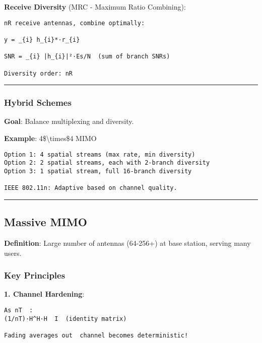 \textbf{Receive Diversity} (MRC - Maximum Ratio Combining):

\begin{verbatim}
nR receive antennas, combine optimally:

y = _{i} h_{i}*·r_{i}

SNR = _{i} |h_{i}|²·Es/N  (sum of branch SNRs)

Diversity order: nR
\end{verbatim}

\begin{center}\rule{0.5\linewidth}{0.5pt}\end{center}

\subsubsection{Hybrid Schemes}\label{hybrid-schemes}

\textbf{Goal}: Balance multiplexing and diversity.

\textbf{Example}: 4\$\textbackslash times\$4 MIMO

\begin{verbatim}
Option 1: 4 spatial streams (max rate, min diversity)
Option 2: 2 spatial streams, each with 2-branch diversity
Option 3: 1 spatial stream, full 16-branch diversity

IEEE 802.11n: Adaptive based on channel quality.
\end{verbatim}

\begin{center}\rule{0.5\linewidth}{0.5pt}\end{center}

\subsection{\texorpdfstring{ Massive
MIMO}{ Massive MIMO}}\label{massive-mimo}

\textbf{Definition}: Large number of antennas (64-256+) at base station,
serving many users.

\subsubsection{Key Principles}\label{key-principles}

\textbf{1. Channel Hardening}:

\begin{verbatim}
As nT  :
(1/nT)·H^H·H  I  (identity matrix)

Fading averages out  channel becomes deterministic!
\end{verbatim}

